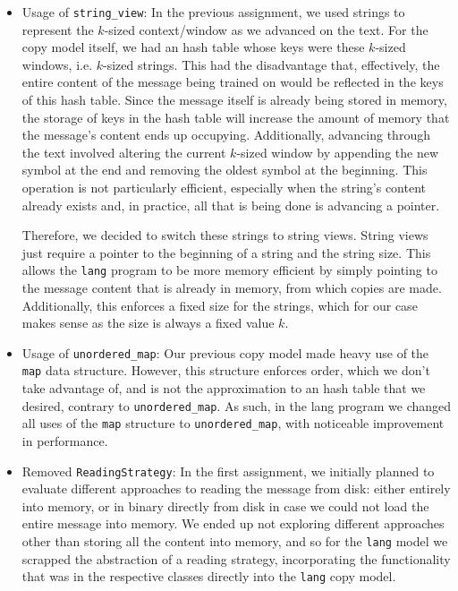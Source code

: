\documentclass{article}
\begin{document}
\begin{itemize}
    \item Usage of \texttt{string_view}:
    In the previous assignment, we used strings to represent the $k$-sized context/window as we advanced on the text.
    For the copy model itself, we had an hash table whose keys were these $k$-sized windows, i.e. $k$-sized strings.
    This had the disadvantage that, effectively, the entire content of the message being trained on would be reflected in the keys of this hash table.
    Since the message itself is already being stored in memory, the storage of keys in the hash table will increase the amount of memory that the message's content ends up occupying.
    Additionally, advancing through the text involved altering the current $k$-sized window by appending the new symbol at the end and removing the oldest symbol at the beginning.
    This operation is not particularly efficient, especially when the string's content already exists and, in practice, all that is being done is advancing a pointer.

    Therefore, we decided to switch these strings to string views.
    String views just require a pointer to the beginning of a string and the string size.
    This allows the \texttt{lang} program to be more memory efficient by simply pointing to the message content that is already in memory, from which copies are made.
    Additionally, this enforces a fixed size for the strings, which for our case makes sense as the size is always a fixed value $k$.
    
    \item Usage of \texttt{unordered_map}:
    Our previous copy model made heavy use of the \texttt{map} data structure.
    However, this structure enforces order, which we don't take advantage of, and is not the approximation to an hash table that we desired, contrary to \texttt{unordered_map}.
    As such, in the lang program we changed all uses of the \texttt{map} structure to \texttt{unordered_map}, with noticeable improvement in performance.
    
    \item Removed \texttt{ReadingStrategy}:
    In the first assignment, we initially planned to evaluate different approaches to reading the message from disk: either entirely into memory, or in binary directly from disk in case we could not load the entire message into memory.
    We ended up not exploring different approaches other than storing all the content into memory, and so for the \texttt{lang} model we scrapped the abstraction of a reading strategy, incorporating the functionality that was in the respective classes directly into the \texttt{lang} copy model.
\end{itemize}
\end{document}
